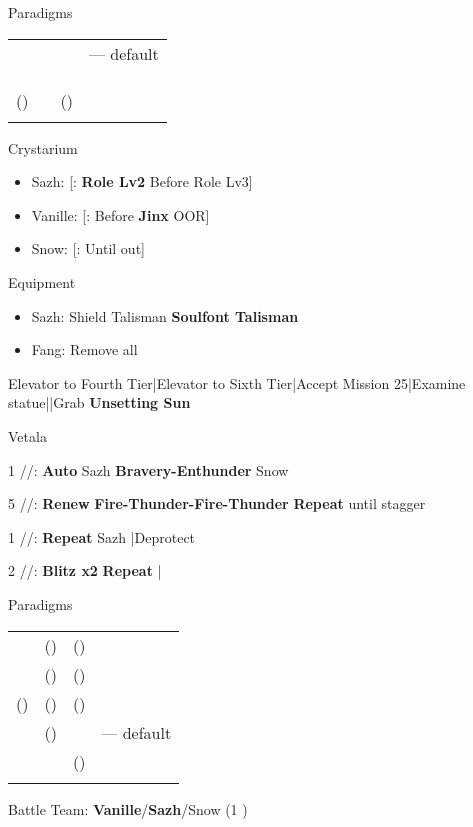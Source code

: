 \begin{menu}
	\item Paradigms
	\begin{tabular}{cccl}
		\syn   & \sab & \rav   & --- default \\
		\com   & \med & \com   &             \\
		\syn   & \med & \com   &             \\
		\com   & \sab & \com   &             \\
		(\rav) & \sab & (\rav) &             \\
		\com   & \rav & \com   &
	\end{tabular}
	\item Crystarium
	\begin{itemize}
		\item Sazh: [\rav: \textbf{Role Lv2} \to Before Role Lv3]
		\item Vanille: [\sab: Before \textbf{Jinx} OOR]
		\item Snow: [\sen: Until out]
	\end{itemize}
	\item Equipment
	\begin{itemize}
		\item Sazh: Shield Talisman \to \textbf{Soulfont Talisman}
		\item Fang: Remove all
	\end{itemize}
\end{menu}
\begin{mainlist}
	\item Elevator to Fourth Tier|Elevator to Sixth Tier|Accept Mission 25|Examine statue|\skip|Grab \textbf{Unsetting Sun}
\end{mainlist}
\begin{fight}{Vetala}
	\item [1] \syn/\sab/\rav: \textbf{Auto} Sazh \to \textbf{Bravery-Enthunder} Snow
	\item [5] \rav/\sab/\rav: \textbf{Renew} \to \textbf{Fire-Thunder-Fire-Thunder} \to \textbf{Repeat} until stagger
	\item [1] \syn/\sab/\rav: \textbf{Repeat} Sazh |Deprotect
	\item [2] \com/\med/\com: \textbf{Blitz x2} \to \textbf{Repeat} |\skip
\end{fight}
\begin{menu}
	\item Paradigms
	\begin{tabular}{cccl}
		\syn   & (\rav) & (\sen) &             \\
		\com   & (\rav) & (\rav) &             \\
		(\rav) & (\rav) & (\sen) &             \\
		\com   & (\rav) & \com   & --- default \\
		\rav   & \sab   & (\sen) &             \\
		\com   & \rav   & \com   &
	\end{tabular}
	\item Battle Team: \textbf{Vanille}/\textbf{Sazh}/Snow (1 )
\end{menu}
